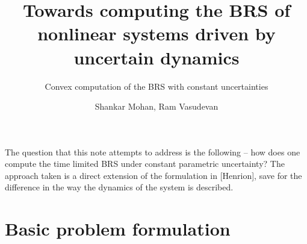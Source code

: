 \documentclass[10pt]{scrartcl}
\theoremstyle{remark}
\begin{document}
\title{Towards computing the BRS of nonlinear systems driven by uncertain dynamics}
\subtitle{Convex computation of the BRS with constant uncertainties}
\author{Shankar Mohan, Ram Vasudevan}
\maketitle
The question that this note attempts to address is the following -- how does one compute the time limited BRS under constant parametric uncertainty? The approach taken is a direct extension of the formulation in [Henrion], save for the difference in the way the dynamics of the system is described.

\section{Basic problem formulation}
\end{document}
